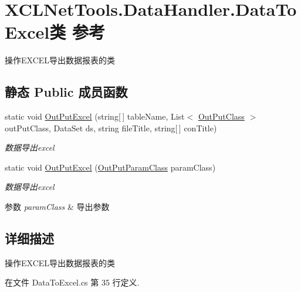 \hypertarget{class_x_c_l_net_tools_1_1_data_handler_1_1_data_to_excel}{\section{X\-C\-L\-Net\-Tools.\-Data\-Handler.\-Data\-To\-Excel类 参考}
\label{class_x_c_l_net_tools_1_1_data_handler_1_1_data_to_excel}
}


操作\-E\-X\-C\-E\-L导出数据报表的类  


\subsection*{静态 Public 成员函数}
\begin{DoxyCompactItemize}
\item 
static void \hyperlink{class_x_c_l_net_tools_1_1_data_handler_1_1_data_to_excel_ab2355fae5c2f8c39b72472b59dee898b}{Out\-Put\-Excel} (string\mbox{[}$\,$\mbox{]} table\-Name, List$<$ \hyperlink{class_x_c_l_net_tools_1_1_data_handler_1_1_out_put_class}{Out\-Put\-Class} $>$ out\-Put\-Class, Data\-Set ds, string file\-Title, string\mbox{[}$\,$\mbox{]} con\-Title)
\begin{DoxyCompactList}\small\item\em 数据导出excel \end{DoxyCompactList}\item 
static void \hyperlink{class_x_c_l_net_tools_1_1_data_handler_1_1_data_to_excel_ae9071c256d304ff488e4f603aac980ad}{Out\-Put\-Excel} (\hyperlink{class_x_c_l_net_tools_1_1_data_handler_1_1_out_put_param_class}{Out\-Put\-Param\-Class} param\-Class)
\begin{DoxyCompactList}\small\item\em 数据导出excel 
\begin{DoxyParams}{参数}
{\em param\-Class} & 导出参数\\
\hline
\end{DoxyParams}
\end{DoxyCompactList}\end{DoxyCompactItemize}


\subsection{详细描述}
操作\-E\-X\-C\-E\-L导出数据报表的类 



在文件 Data\-To\-Excel.\-cs 第 35 行定义.



